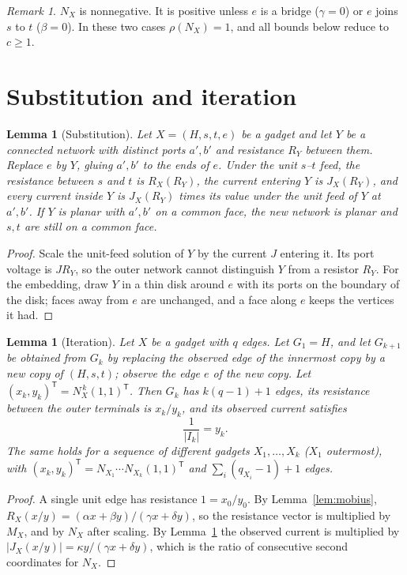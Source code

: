 \documentclass[11pt]{amsart}
\theoremstyle{plain}
\newtheorem{lemma}[theorem]{Lemma}
\theoremstyle{definition}
\theoremstyle{remark}
\newtheorem{remark}{Remark}
\newcommand{\T}{\mathsf{T}}
\begin{document}
\begin{remark}\label{rem:pos}
$N_X$ is nonnegative. It is positive unless $e$ is a bridge ($\gamma=0$) or $e$ joins $s$ to $t$ ($\beta=0$). In
these two cases $\rho(N_X)=1$, and all bounds below reduce to $c\ge1$.
\end{remark}

\section{Substitution and iteration}

\begin{lemma}[Substitution]\label{lem:subst}
Let $X=(H,s,t,e)$ be a gadget and let $Y$ be a connected network with distinct ports $a',b'$ and resistance $R_Y$
between them. Replace $e$ by $Y$, gluing $a',b'$ to the ends of $e$. Under the unit $s$--$t$ feed, the resistance
between $s$ and $t$ is $R_X(R_Y)$, the current entering $Y$ is $J_X(R_Y)$, and every current inside $Y$ is
$J_X(R_Y)$ times its value under the unit feed of $Y$ at $a',b'$. If $Y$ is planar with $a',b'$ on a common face,
the new network is planar and $s,t$ are still on a common face.
\end{lemma}
\begin{proof}
Scale the unit-feed solution of $Y$ by the current $J$ entering it. Its port voltage is $JR_Y$, so the outer
network cannot distinguish $Y$ from a resistor $R_Y$. For the embedding, draw $Y$ in a thin disk around $e$ with
its ports on the boundary of the disk; faces away from $e$ are unchanged, and a face along $e$ keeps the vertices
it had.
\end{proof}

\begin{lemma}[Iteration]\label{lem:iter}
Let $X$ be a gadget with $q$ edges. Let $G_1=H$, and let $G_{k+1}$ be obtained from $G_k$ by replacing the observed
edge of the innermost copy by a new copy of $(H,s,t)$; observe the edge $e$ of the new copy. Let
$(x_k,y_k)^{\T}=N_X^{\,k}(1,1)^{\T}$. Then $G_k$ has $k(q-1)+1$ edges, its resistance between the outer terminals
is $x_k/y_k$, and its observed current satisfies
\[
\frac1{|I_k|}=y_k .
\]
The same holds for a sequence of different gadgets $X_1,\dots,X_k$ ($X_1$ outermost), with
$(x_k,y_k)^{\T}=N_{X_1}\cdots N_{X_k}(1,1)^{\T}$ and $\sum_i(q_{X_i}-1)+1$ edges.
\end{lemma}
\begin{proof}
A single unit edge has resistance $1=x_0/y_0$. By Lemma~\ref{lem:mobius},
$R_X(x/y)=(\alpha x+\beta y)/(\gamma x+\delta y)$, so the resistance vector is multiplied by $M_X$, and by $N_X$
after scaling. By Lemma~\ref{lem:subst} the observed current is multiplied by
$|J_X(x/y)|=\kappa y/(\gamma x+\delta y)$, which is the ratio of consecutive second coordinates for $N_X$.
\end{proof}
\end{document}
